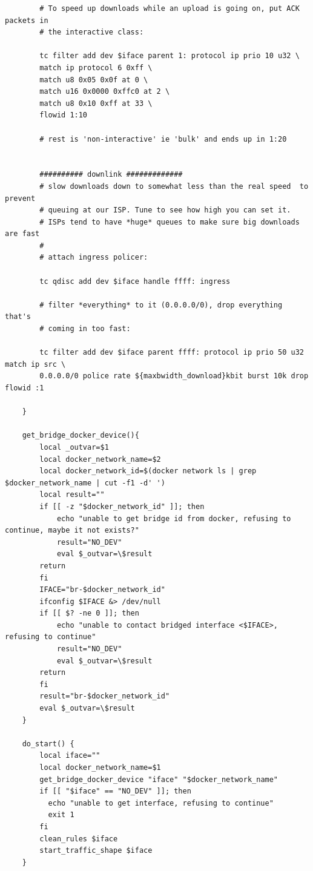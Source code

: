 \begin{verbatim}
        # To speed up downloads while an upload is going on, put ACK packets in
        # the interactive class:
    
        tc filter add dev $iface parent 1: protocol ip prio 10 u32 \
        match ip protocol 6 0xff \
        match u8 0x05 0x0f at 0 \
        match u16 0x0000 0xffc0 at 2 \
        match u8 0x10 0xff at 33 \
        flowid 1:10
    
        # rest is 'non-interactive' ie 'bulk' and ends up in 1:20
    
    
        ########## downlink #############
        # slow downloads down to somewhat less than the real speed  to prevent
        # queuing at our ISP. Tune to see how high you can set it.
        # ISPs tend to have *huge* queues to make sure big downloads are fast
        #
        # attach ingress policer:
    
        tc qdisc add dev $iface handle ffff: ingress
    
        # filter *everything* to it (0.0.0.0/0), drop everything that's
        # coming in too fast:
    
        tc filter add dev $iface parent ffff: protocol ip prio 50 u32 match ip src \
        0.0.0.0/0 police rate ${maxbwidth_download}kbit burst 10k drop flowid :1
    
    }
    
    get_bridge_docker_device(){
        local _outvar=$1
        local docker_network_name=$2
        local docker_network_id=$(docker network ls | grep $docker_network_name | cut -f1 -d' ')
        local result=""
        if [[ -z "$docker_network_id" ]]; then
            echo "unable to get bridge id from docker, refusing to continue, maybe it not exists?"
            result="NO_DEV"
            eval $_outvar=\$result
        return
        fi
        IFACE="br-$docker_network_id"
        ifconfig $IFACE &> /dev/null
        if [[ $? -ne 0 ]]; then
            echo "unable to contact bridged interface <$IFACE>, refusing to continue"
            result="NO_DEV"
            eval $_outvar=\$result
        return
        fi
        result="br-$docker_network_id"
        eval $_outvar=\$result
    }
    
    do_start() {
        local iface=""
        local docker_network_name=$1
        get_bridge_docker_device "iface" "$docker_network_name"
        if [[ "$iface" == "NO_DEV" ]]; then
          echo "unable to get interface, refusing to continue"
          exit 1
        fi
        clean_rules $iface
        start_traffic_shape $iface
    }
    

\end{verbatim}
